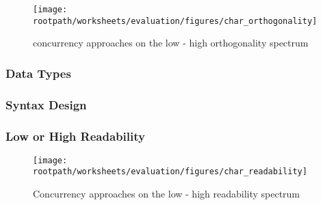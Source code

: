 \begin{figure}[htbp]
\centering
 \texttt{[image: \\rootpath/worksheets/evaluation/figures/char\_orthogonality]} 
 \caption{concurrency approaches on the low - high orthogonality spectrum}
\label{fig:char_orthogonality}
\end{figure}

\subsubsection{Data Types}\label{subsec:datatypes}

\subsubsection{Syntax Design}\label{subsec:syntaxdesign}

\subsubsection{Low or High Readability}\label{subsec:char_readability}

\begin{figure}[htbp]
\centering
 \texttt{[image: \\rootpath/worksheets/evaluation/figures/char\_readability]} 
 \caption{Concurrency approaches on the low - high readability spectrum}
\label{fig:char_readability}
\end{figure}

